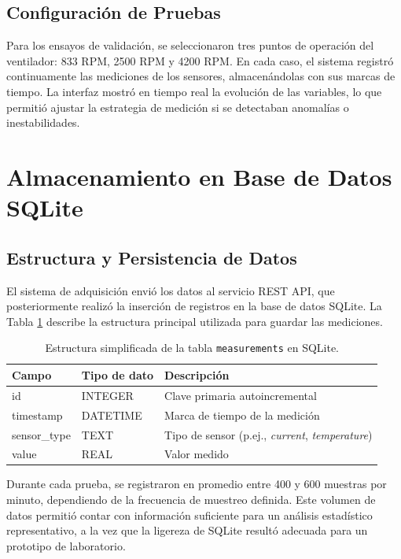 \subsection{Configuración de Pruebas}
Para los ensayos de validación, se seleccionaron tres puntos de operación del ventilador: 833 RPM, 2500 RPM y 4200 RPM. En cada caso, el sistema registró continuamente las mediciones de los sensores, almacenándolas con sus marcas de tiempo. La interfaz mostró en tiempo real la evolución de las variables, lo que permitió ajustar la estrategia de medición si se detectaban anomalías o inestabilidades.

\section{Almacenamiento en Base de Datos SQLite}
\subsection{Estructura y Persistencia de Datos}
El sistema de adquisición envió los datos al servicio REST API, que posteriormente realizó la inserción de registros en la base de datos SQLite. La Tabla \ref{tab:tabla_measurements} describe la estructura principal utilizada para guardar las mediciones.

\begin{table}[htbp]
    \centering
    \caption{Estructura simplificada de la tabla \texttt{measurements} en SQLite.}
    \label{tab:tabla_measurements}
    \begin{tabular}{l l l}
    \toprule
    \textbf{Campo} & \textbf{Tipo de dato} & \textbf{Descripción}\\
    \midrule
    id & INTEGER & Clave primaria autoincremental \\
    timestamp & DATETIME & Marca de tiempo de la medición \\
    sensor\_type & TEXT & Tipo de sensor (p.ej., \textit{current}, \textit{temperature}) \\
    value & REAL & Valor medido \\
    \bottomrule
    \end{tabular}
\end{table}

Durante cada prueba, se registraron en promedio entre 400 y 600 muestras por minuto, dependiendo de la frecuencia de muestreo definida. Este volumen de datos permitió contar con información suficiente para un análisis estadístico representativo, a la vez que la ligereza de SQLite resultó adecuada para un prototipo de laboratorio.

